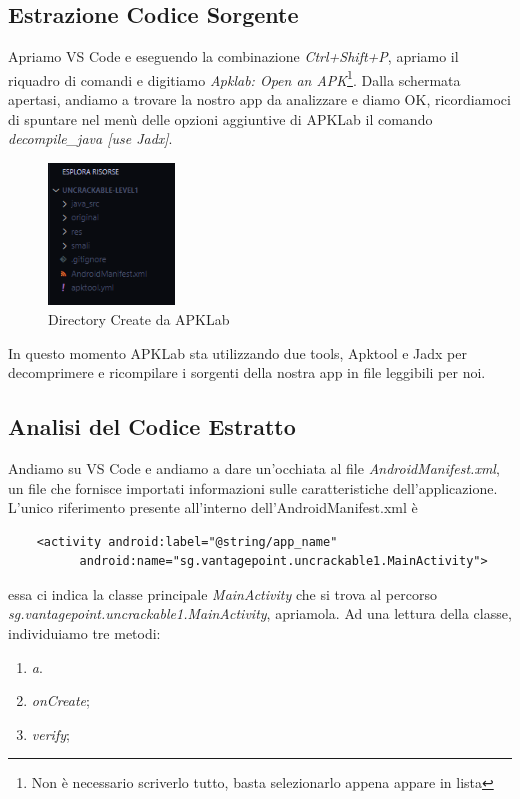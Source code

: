 \documentclass{article}
\begin{document}
\subsection{Estrazione Codice Sorgente}
Apriamo VS Code e eseguendo la combinazione \textit{Ctrl+Shift+P}, apriamo il riquadro di comandi e digitiamo 
\textit{Apklab: Open an APK}\footnote{Non è necessario scriverlo tutto, basta selezionarlo appena appare in lista}. 
Dalla schermata apertasi, andiamo a trovare la nostro app da analizzare e diamo OK, ricordiamoci di 
spuntare nel menù delle opzioni aggiuntive di APKLab il comando \textit{decompile\_java [use Jadx]}. 
\begin{figure}[htbp]
    \centering
    \includegraphics[width=0.3\textwidth]{./uncrackable1/apklabDirGen.png}
    \captionsetup{labelformat=empty}
    \caption{Directory Create da APKLab}
    \label{fig:apklabDirGen}
\end{figure}
In questo momento APKLab sta utilizzando due tools, Apktool\cite{apktool} e Jadx\cite{jadx} per decomprimere e ricompilare 
i sorgenti della nostra app in file leggibili per noi.

\subsection{Analisi del Codice Estratto}
Andiamo su VS Code e andiamo a dare un'occhiata al file \textit{AndroidManifest.xml}, un file che fornisce importati informazioni
 sulle caratteristiche dell'applicazione. L'unico riferimento presente all'interno dell'AndroidManifest.xml è 
 \begin{verbatim}
    <activity android:label="@string/app_name" 
          android:name="sg.vantagepoint.uncrackable1.MainActivity">
 \end{verbatim} 
 essa ci indica la classe principale \textit{MainActivity} che si trova al percorso \emph{sg.vantagepoint.uncrackable1.MainActivity}, 
 apriamola.
Ad una lettura della classe, individuiamo tre metodi: 
\begin{enumerate}
    \item \textit{a}.
    \item \textit{onCreate};
    \item \textit{verify};
\end{enumerate}
\end{document}
